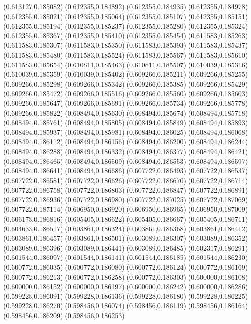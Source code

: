 (0.613127,0.185082)
(0.612355,0.184892)
(0.612355,0.184935)
(0.612355,0.184978)
(0.612355,0.185021)
(0.612355,0.185064)
(0.612355,0.185107)
(0.612355,0.185151)
(0.612355,0.185194)
(0.612355,0.185237)
(0.612355,0.185280)
(0.612355,0.185324)
(0.612355,0.185367)
(0.612355,0.185410)
(0.612355,0.185454)
(0.611583,0.185263)
(0.611583,0.185307)
(0.611583,0.185350)
(0.611583,0.185393)
(0.611583,0.185437)
(0.611583,0.185480)
(0.611583,0.185524)
(0.611583,0.185567)
(0.611583,0.185610)
(0.611583,0.185654)
(0.610811,0.185463)
(0.610811,0.185507)
(0.610039,0.185316)
(0.610039,0.185359)
(0.610039,0.185402)
(0.609266,0.185211)
(0.609266,0.185255)
(0.609266,0.185298)
(0.609266,0.185342)
(0.609266,0.185385)
(0.609266,0.185429)
(0.609266,0.185472)
(0.609266,0.185516)
(0.609266,0.185560)
(0.609266,0.185603)
(0.609266,0.185647)
(0.609266,0.185691)
(0.609266,0.185734)
(0.609266,0.185778)
(0.609266,0.185822)
(0.608494,0.185630)
(0.608494,0.185674)
(0.608494,0.185718)
(0.608494,0.185761)
(0.608494,0.185805)
(0.608494,0.185849)
(0.608494,0.185893)
(0.608494,0.185937)
(0.608494,0.185981)
(0.608494,0.186025)
(0.608494,0.186068)
(0.608494,0.186112)
(0.608494,0.186156)
(0.608494,0.186200)
(0.608494,0.186244)
(0.608494,0.186288)
(0.608494,0.186332)
(0.608494,0.186377)
(0.608494,0.186421)
(0.608494,0.186465)
(0.608494,0.186509)
(0.608494,0.186553)
(0.608494,0.186597)
(0.608494,0.186641)
(0.608494,0.186686)
(0.607722,0.186493)
(0.607722,0.186537)
(0.607722,0.186581)
(0.607722,0.186626)
(0.607722,0.186670)
(0.607722,0.186714)
(0.607722,0.186758)
(0.607722,0.186803)
(0.607722,0.186847)
(0.607722,0.186891)
(0.607722,0.186936)
(0.607722,0.186980)
(0.607722,0.187025)
(0.607722,0.187069)
(0.607722,0.187114)
(0.606950,0.186920)
(0.606950,0.186965)
(0.606950,0.187009)
(0.606178,0.186816)
(0.605405,0.186622)
(0.605405,0.186667)
(0.605405,0.186711)
(0.604633,0.186517)
(0.603861,0.186324)
(0.603861,0.186368)
(0.603861,0.186412)
(0.603861,0.186457)
(0.603861,0.186501)
(0.603089,0.186307)
(0.603089,0.186352)
(0.603089,0.186396)
(0.603089,0.186441)
(0.603089,0.186485)
(0.602317,0.186291)
(0.601544,0.186097)
(0.601544,0.186141)
(0.601544,0.186185)
(0.601544,0.186230)
(0.600772,0.186035)
(0.600772,0.186080)
(0.600772,0.186124)
(0.600772,0.186169)
(0.600772,0.186213)
(0.600772,0.186258)
(0.600772,0.186303)
(0.600000,0.186108)
(0.600000,0.186152)
(0.600000,0.186197)
(0.600000,0.186242)
(0.600000,0.186286)
(0.599228,0.186091)
(0.599228,0.186136)
(0.599228,0.186180)
(0.599228,0.186225)
(0.599228,0.186270)
(0.598456,0.186074)
(0.598456,0.186119)
(0.598456,0.186164)
(0.598456,0.186209)
(0.598456,0.186253)
